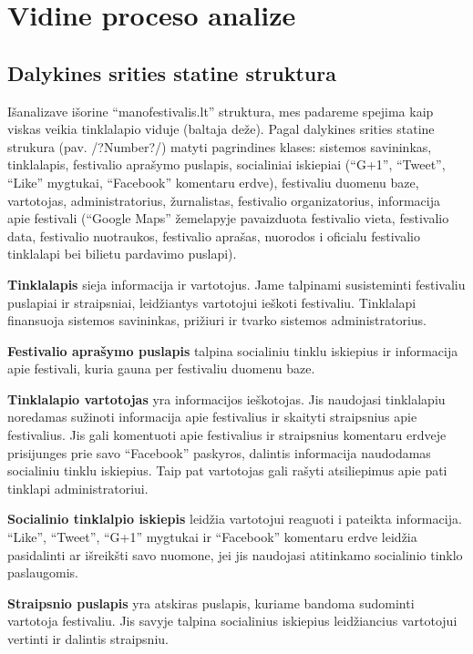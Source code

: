 ﻿\documentclass{VUMIFPSkursinis}
\begin{document}
\section{Vidine proceso analize}
\subsection {Dalykines srities statine struktura}
Išanalizave išorine “manofestivalis.lt” struktura, mes padareme spejima kaip viskas veikia tinklalapio viduje (baltaja deže).
Pagal dalykines srities statine strukura (pav. /?Number?/) matyti pagrindines klases: sistemos savininkas, tinklalapis, festivalio aprašymo puslapis,
 socialiniai iskiepiai (“G+1”, “Tweet”, “Like” mygtukai, “Facebook” komentaru erdve), festivaliu duomenu baze, vartotojas, administratorius, žurnalistas, festivalio organizatorius,
 informacija apie festivali (“Google Maps” žemelapyje pavaizduota festivalio vieta, festivalio data, festivalio nuotraukos, festivalio aprašas, nuorodos i oficialu festivalio tinklalapi bei bilietu pardavimo puslapi). 

\textbf{Tinklalapis} sieja informacija ir vartotojus. Jame talpinami susisteminti festivaliu puslapiai ir straipsniai, leidžiantys vartotojui ieškoti festivaliu. Tinklalapi finansuoja sistemos savininkas, prižiuri ir tvarko sistemos administratorius.

\textbf{Festivalio aprašymo puslapis} talpina socialiniu tinklu iskiepius ir informacija apie festivali, kuria gauna per festivaliu duomenu baze.  

\textbf{Tinklalapio vartotojas} yra informacijos ieškotojas. Jis naudojasi tinklalapiu noredamas sužinoti informacija apie festivalius ir skaityti straipsnius apie festivalius. Jis gali komentuoti apie festivalius ir straipsnius komentaru erdveje prisijunges prie savo “Facebook” paskyros, dalintis informacija naudodamas socialiniu tinklu iskiepius. Taip pat vartotojas gali rašyti atsiliepimus apie pati tinklapi administratoriui.

\textbf{Socialinio tinklalpio iskiepis} leidžia vartotojui reaguoti i pateikta informacija. “Like”, “Tweet”, “G+1” mygtukai  ir “Facebook” komentaru erdve leidžia pasidalinti ar išreikšti savo nuomone, jei jis naudojasi atitinkamo socialinio tinklo paslaugomis.

\textbf{Straipsnio puslapis} yra atskiras puslapis, kuriame bandoma sudominti vartotoja festivaliu. Jis savyje talpina socialinius iskiepius leidžiancius vartotojui vertinti ir dalintis straipsniu.
\end{document}
